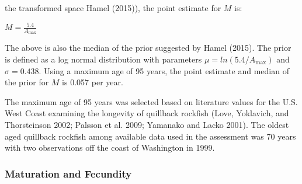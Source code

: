 \documentclass[11pt,
  english,
  a4paper,
]{article}
\begin{document}
the transformed space Hamel {(2015)\leavevmode\tagmcend\tagstructend}), the point estimate for {\(M\)\leavevmode\tagmcend\tagstructend} is:

\leavevmode\tagmcend\tagstructend\par

\begin{centering}

$M=\frac{5.4}{A_{\text{max}}}$

\end{centering}


The above is also the median of the prior suggested by Hamel {(2015)\leavevmode\tagmcend\tagstructend}. The prior is defined as a log normal distribution with parameters {\(\mu = ln(5.4/A_{\text{max}})\)\leavevmode\tagmcend\tagstructend} and {\(\sigma = 0.438\)\leavevmode\tagmcend\tagstructend}. Using a maximum age of 95 years, the point estimate and median of the prior for {\(M\)\leavevmode\tagmcend\tagstructend} is 0.057 per year.

\leavevmode\tagmcend\tagstructend\par


The maximum age of 95 years was selected based on literature values for the U.S. West Coast examining the longevity of quillback rockfish {(Love, Yoklavich, and Thorsteinson 2002; Palsson et al. 2009; Yamanako and Lacko 2001)\leavevmode\tagmcend\tagstructend}. The oldest aged quillback rockfish among available data used in the assessment was 70 years with two observations off the coast of Washington in 1999.

\leavevmode\tagmcend\tagstructend\par


\hypertarget{maturation-and-fecundity}{%
\subsubsection{Maturation and Fecundity}\label{maturation-and-fecundity}}
\end{document}
